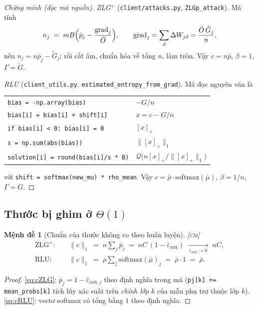\documentclass[11pt,a4paper]{article}
\newtheorem{menhde}[dinhly]{Mệnh đề}
\theoremstyle{remark}
\newcommand{\pos}[1]{\left[#1\right]_+}
\newcommand{\quant}{\mathcal{Q}}
\newcommand{\epsaux}{\bar\varepsilon_{\mathrm{aux}}}
\newcommand{\code}[1]{\texttt{\small #1}}
\begin{document}
\begin{proof}[Chứng minh (đọc mã nguồn)]
\emph{ZLG$^+$} (\code{client/attacks.py}, \code{ZLGp\_attack}). Mã tính
\[
n_j \;=\; mB\Bigl(\bar p_j-\frac{\mathrm{grad}_j}{\bar O}\Bigr),
\qquad
\mathrm{grad}_j=\sum_d\Delta W_{jd}=\frac{\bar O\,\tilde G_j}{n},
\]
nên $n_j=n\bar p_j-\tilde G_j$; rồi cắt âm, chuẩn hóa về tổng $n$, làm tròn.
Vậy $c=n\bar p$, $\beta=1$, $\Gamma=\tilde G$.

\emph{RLU} (\code{client\_utils.py}, \code{estimated\_entropy\_from\_grad}).
Mã đọc nguyên văn là
\begin{center}
\begin{tabular}{@{}ll@{}}
\code{bias = -np.array(bias)}            & $-G/n$ \\
\code{bias[i] = bias[i] + shift[i]}      & $x=c-G/n$ \\
\code{if bias[i] < 0: bias[i] = 0}       & $\pos{x}$ \\
\code{s = np.sum(abs(bias))}             & $\|\pos{x}\|_1$ \\
\code{solution[i] = round(bias[i]/s * B)}& $\quant\bigl(n\pos{x}/\|\pos{x}\|_1\bigr)$ \\
\end{tabular}
\end{center}
với \code{shift = softmax(new\_mu) * rho\_mean}. Vậy
$c=\bar\rho\cdot\mathrm{softmax}(\bar\mu)$, $\beta=1/n$, $\Gamma=G$.
\end{proof}

\subsection{Thước bị ghim ở $\Theta(1)$}

\begin{menhde}[Chuẩn của thước không co theo huấn luyện]
\label{md:ghim}
\textsc{[cm]}\;
\begin{align}
\text{ZLG}^+:&\quad \|c\|_1 \;=\; n\sum_j\bar p_j
  \;=\; nC\,(1-\epsaux) \;\xrightarrow[\ \epsaux\to0\ ]{}\; nC ,
\label{eq:cZLG}\\
\text{RLU}:&\quad \|c\|_1 \;=\; \bar\rho\sum_j\mathrm{softmax}(\bar\mu)_j
  \;=\; \bar\rho\cdot 1 \;=\; \bar\rho .
\label{eq:cRLU}
\end{align}
\end{menhde}

\begin{proof}
\eqref{eq:cZLG}: $\bar p_j=1-\bar\varepsilon_{\mathrm{aux},j}$ theo định nghĩa
trong mã (\code{pj[k] += mean\_probs[k]} tích lũy xác suất trên \emph{chính
lớp} $k$ của mẫu phụ trợ thuộc lớp $k$). \eqref{eq:cRLU}: vectơ softmax có
tổng bằng $1$ theo định nghĩa.
\end{proof}
\end{document}
